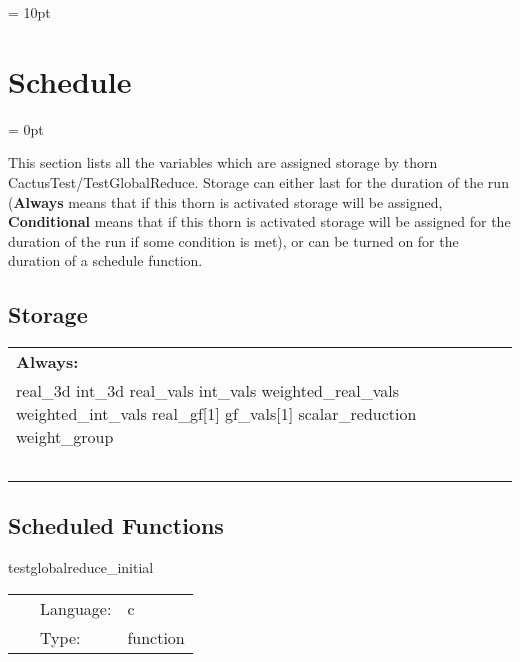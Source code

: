 \vspace{5mm}\parskip = 10pt 

\section{Schedule} 


\parskip = 0pt


\noindent This section lists all the variables which are assigned storage by thorn CactusTest/TestGlobalReduce.  Storage can either last for the duration of the run ({\bf Always} means that if this thorn is activated storage will be assigned, {\bf Conditional} means that if this thorn is activated storage will be assigned for the duration of the run if some condition is met), or can be turned on for the duration of a schedule function.


\subsection*{Storage}

\hspace{5mm}

 \begin{tabular*}{160mm}{ll} 

{\bf Always:}&  ~ \\ 
 real\_3d int\_3d real\_vals int\_vals weighted\_real\_vals weighted\_int\_vals real\_gf[1] gf\_vals[1] scalar\_reduction weight\_group & ~\\ 
~ & ~\\ 
\end{tabular*} 


\subsection*{Scheduled Functions}
\vspace{5mm}


\hspace{5mm} testglobalreduce\_initial 

\hspace{5mm}{\it initialize the input arrays to values } 


\hspace{5mm}

 \begin{tabular*}{160mm}{cll} 
~ & Language:  & c \\ 
~ & Type:  & function \\ 
\end{tabular*} 


